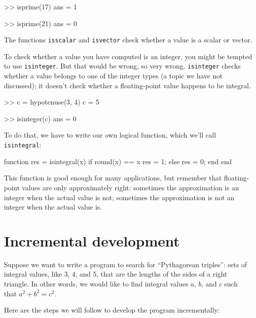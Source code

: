 \documentclass[
]{book}
\numberwithin{Answer}{chapter}
\numberwithin{Exercise}{chapter}
\begin{document}
\begin{code}
>> isprime(17)
ans = 1

>> isprime(21)
ans = 0
\end{code}

The functions {\tt isscalar} and {\tt isvector} check whether
a value is a scalar or vector.

To check whether a value you have computed is an integer, you might
be tempted to use {\tt isinteger}.  But that would be wrong, so very
wrong.  {\tt isinteger} checks whether a value belongs to one of
the integer types (a topic we have not discussed); it doesn't check
whether a floating-point value happens to be integral.

\begin{code}
>> c = hypotenuse(3, 4)
c = 5

>> isinteger(c)
ans = 0
\end{code}

To do that, we have to write our own logical function, which
we'll call {\tt isintegral}:

\begin{code}
function res = isintegral(x)
    if round(x) == x
        res = 1;       %
    else
        res = 0;       %
    end
end
\end{code}

This function is good enough for many applications, but remember
that floating-point values are only approximately right:
sometimes the approximation is an integer when the actual value is not; 
sometimes the approximation is not an integer when the actual value is.



\section{Incremental development}
\label{sect:increxample}

Suppose we want to write a program to search for ``Pythagorean
triples'': sets of integral values, like 3, 4, and 5,
that are the lengths of the sides of a right triangle.  In other
words, we would like to find integral values $a$, $b$, and $c$ such
that $a^2 + b^2 = c^2$.


Here are the steps we will follow to develop the program incrementally:
\end{document}
